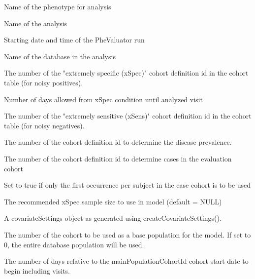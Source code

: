 \documentclass[a4paper]{book}
\begin{document}
\begin{Arguments}
\begin{ldescription}
\item[\code{phenotype}] Name of the phenotype for analysis

\item[\code{analysisName}] Name of the analysis

\item[\code{runDateTime}] Starting date and time of the PheValuator run

\item[\code{databaseId}] Name of the database in the analysis

\item[\code{xSpecCohortId}] The number of the "extremely specific (xSpec)" cohort
definition id in the cohort table (for noisy positives).

\item[\code{daysFromxSpec}] Number of days allowed from xSpec condition until analyzed
visit

\item[\code{xSensCohortId}] The number of the "extremely sensitive (xSens)" cohort
definition id in the cohort table (for noisy negatives).

\item[\code{prevalenceCohortId}] The number of the cohort definition id to determine the
disease prevalence.

\item[\code{caseCohortId}] The number of the cohort definition id to determine cases
in the evaluation cohort

\item[\code{caseFirstOccurrenceOnly}] Set to true if only the first occurrence per subject in
the case cohort is to be used

\item[\code{xSpecCohortSize}] The recommended xSpec sample size to use in model (default
= NULL)

\item[\code{covariateSettings}] A covariateSettings object as generated using
createCovariateSettings().

\item[\code{modelPopulationCohortId}] The number of the cohort to be used as a base population
for the model. If set to 0, the entire database population
will be used.

\item[\code{modelPopulationCohortIdStartDay}] The number of days relative to the mainPopulationCohortId
cohort start date to begin including visits.


\end{ldescription}
\end{Arguments}
\end{document}
